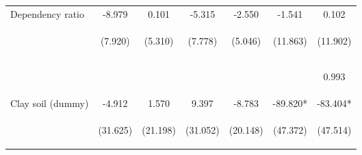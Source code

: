 \begin{center}
\begin{tabular}{lcccccc}
Dependency ratio & -8.979 & 0.101 & -5.315 & -2.550 & -1.541 & 0.102 \\
 & \begin{footnotesize}(7.920)\end{footnotesize} & \begin{footnotesize}(5.310)\end{footnotesize} & \begin{footnotesize}(7.778)\end{footnotesize} & \begin{footnotesize}(5.046)\end{footnotesize} & \begin{footnotesize}(11.863)\end{footnotesize} & \begin{footnotesize}(11.902)\end{footnotesize} \\
\vspace{4pt} & \begin{footnotesize}[0.257]\end{footnotesize} & \begin{footnotesize}[0.985]\end{footnotesize} & \begin{footnotesize}[0.494]\end{footnotesize} & \begin{footnotesize}[0.613]\end{footnotesize} & \begin{footnotesize}[0.897]\end{footnotesize} & \begin{footnotesize}0.993\end{footnotesize} \\
Clay soil (dummy) & -4.912 & 1.570 & 9.397 & -8.783 & -89.820* & -83.404* \\
 & \begin{footnotesize}(31.625)\end{footnotesize} & \begin{footnotesize}(21.198)\end{footnotesize} & \begin{footnotesize}(31.052)\end{footnotesize} & \begin{footnotesize}(20.148)\end{footnotesize} & \begin{footnotesize}(47.372)\end{footnotesize} & \begin{footnotesize}(47.514)\end{footnotesize} \\

\end{tabular}
\end{center}

